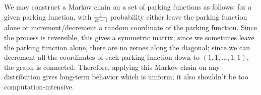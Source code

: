 We may construct a Markov chain on a set of parking functions as follows: for a given parking function, with $\frac{1}{2c+1}$ probability either leave the parking function alone or increment/decrement a random coordinate of the parking function. Since the process is reversible, this gives a symmetric matrix; since we sometimes leave the parking function alone, there are no zeroes along the diagonal; since we can decrement all the coordinates of each parking function down to $(1,1,...,1,1),$ the graph is connected. Therefore, applying this Markov chain on any distribution gives long-term behavior which is uniform; it also shouldn't be too computation-intensive.
